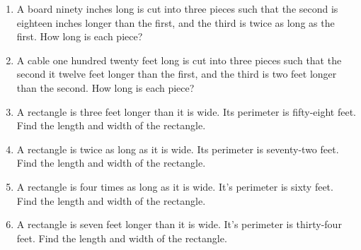 \documentclass[12pt]{article}
\begin{document}
\begin{enumerate}
\item A board ninety inches long is cut into three pieces such that the second is eighteen inches longer than the first, and the third is twice as long as the first. How long is each piece?
	\spacing

\item A cable one hundred twenty feet long is cut into three pieces such that the second it twelve feet longer than the first, and the third is two feet longer than the second. How long is each piece?
	\spacing

\item A rectangle is three feet longer than it is wide. Its perimeter is fifty-eight feet. Find the length and width of the rectangle.
	\spacing

\item A rectangle is twice as long as it is wide. Its perimeter is seventy-two feet. Find the length and width of the rectangle.
	\spacing

\item A rectangle is four times as long as it is wide. It's perimeter is sixty feet. Find the length and width of the rectangle.
	\spacing

\item A rectangle is seven feet longer than it is wide. It's perimeter is thirty-four feet. Find the length and width of the rectangle.
	\spacing

\end{enumerate}
\end{document}
